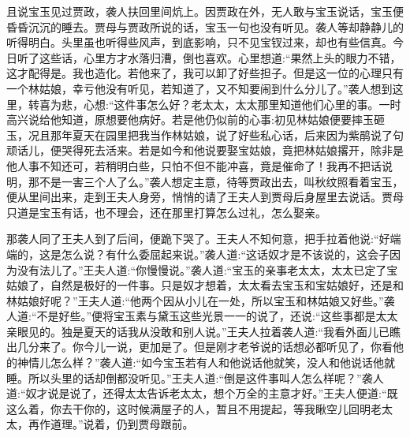 \begin{parag}
    且说宝玉见过贾政，袭人扶回里间炕上。因贾政在外，无人敢与宝玉说话，宝玉便昏昏沉沉的睡去。贾母与贾政所说的话，宝玉一句也没有听见。袭人等却静静儿的听得明白。头里虽也听得些风声，到底影响，只不见宝钗过来，却也有些信真。今日听了这些话，心里方才水落归漕，倒也喜欢。心里想道:“果然上头的眼力不错，这才配得是。我也造化。若他来了，我可以卸了好些担子。但是这一位的心理只有一个林姑娘，幸亏他没有听见，若知道了，又不知要闹到什么分儿了。”袭人想到这里，转喜为悲，心想:“这件事怎么好？老太太，太太那里知道他们心里的事。一时高兴说给他知道，原想要他病好。若是他仍似前的心事:初见林姑娘便要摔玉砸玉，况且那年夏天在园里把我当作林姑娘，说了好些私心话，后来因为紫鹃说了句顽话儿，便哭得死去活来。若是如今和他说要娶宝姑娘，竟把林姑娘撂开，除非是他人事不知还可，若稍明白些，只怕不但不能冲喜，竟是催命了！我再不把话说明，那不是一害三个人了么。”袭人想定主意，待等贾政出去，叫秋纹照看着宝玉，便从里间出来，走到王夫人身旁，悄悄的请了王夫人到贾母后身屋里去说话。贾母只道是宝玉有话，也不理会，还在那里打算怎么过礼，怎么娶亲。
\end{parag}


\begin{parag}
    那袭人同了王夫人到了后间，便跪下哭了。王夫人不知何意，把手拉着他说:“好端端的，这是怎么说？有什么委屈起来说。”袭人道:“这话奴才是不该说的，这会子因为没有法儿了。”王夫人道:“你慢慢说。”袭人道:“宝玉的亲事老太太，太太已定了宝姑娘了，自然是极好的一件事。只是奴才想着，太太看去宝玉和宝姑娘好，还是和林姑娘好呢？”王夫人道:“他两个因从小儿在一处，所以宝玉和林姑娘又好些。”袭人道:“不是好些。”便将宝玉素与黛玉这些光景一一的说了，还说:“这些事都是太太亲眼见的。独是夏天的话我从没敢和别人说。”王夫人拉着袭人道:“我看外面儿已瞧出几分来了。你今儿一说，更加是了。但是刚才老爷说的话想必都听见了，你看他的神情儿怎么样？”袭人道:“如今宝玉若有人和他说话他就笑，没人和他说话他就睡。所以头里的话却倒都没听见。”王夫人道:“倒是这件事叫人怎么样呢？”袭人道:“奴才说是说了，还得太太告诉老太太，想个万全的主意才好。”王夫人便道:“既这么着，你去干你的，这时候满屋子的人，暂且不用提起，等我瞅空儿回明老太太，再作道理。”说着，仍到贾母跟前。
\end{parag}



